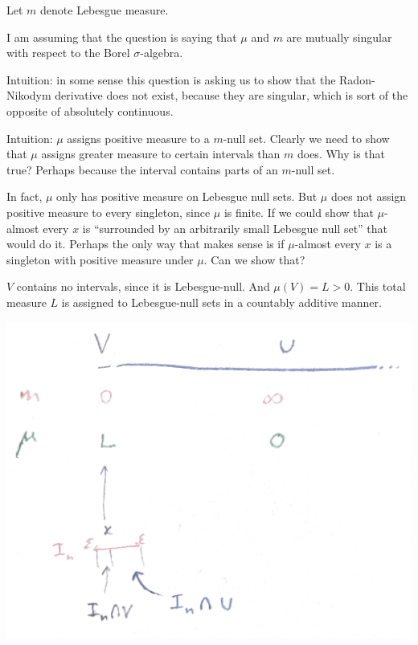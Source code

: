 Let $m$ denote Lebesgue measure.

I am assuming that the question is saying that $\mu$ and $m$ are mutually singular with respect to the
Borel $\sigma$-algebra.

Intuition: in some sense this question is asking us to show that the Radon-Nikodym derivative does not exist,
because they are singular, which is sort of the opposite of absolutely continuous.

Intuition: $\mu$ assigns positive measure to a $m$-null set. Clearly we need to show that $\mu$ assigns greater
measure to certain intervals than $m$ does. Why is that true? Perhaps because the interval contains parts of
an $m$-null set.

In fact, $\mu$ only has positive measure on Lebesgue null sets. But $\mu$ does not assign positive measure to
every singleton, since $\mu$ is finite. If we could show that $\mu$-almost every $x$ is ``surrounded by an
arbitrarily small Lebesgue null set​'' that would do it. Perhaps the only way that makes sense is if
$\mu$-almost every $x$ is a singleton with positive measure under $\mu$. Can we show that?

$V$ contains no intervals, since it is Lebesgue-null. And $\mu(V) = L > 0$. This total measure $L$ is assigned
to Lebesgue-null sets in a countably additive manner.

\begin{mdframed}
\includegraphics[width=400pt]{img/analysis--berkeley-202a-final-fe0f.png}
\end{mdframed}

